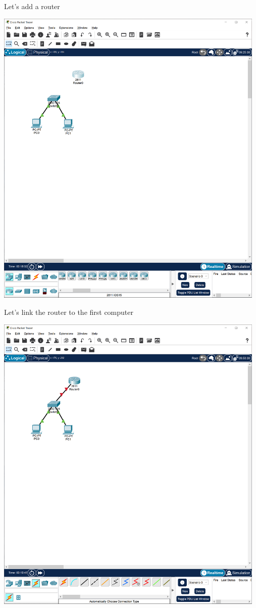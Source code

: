 \documentclass[a4paper,12pt]{article}
\begin{document}
\noindent Let's add a router \newline

\noindent \includegraphics[width=13cm]{./step-by-step/11.PNG}
\clearpage

\noindent Let's link the router to the first computer \newline

\noindent \includegraphics[width=13cm]{./step-by-step/12.PNG}
\clearpage
\end{document}
